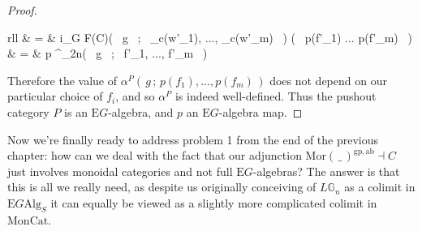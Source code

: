 \begin{proof}
\begin{eq*}
\begin{array}{rll}
			& = &  i_{G \times F(C)}( \, g \, ; \, _{c(w'_1)}, ..., _{c(w'_m)} \, ) \circ \big( \, p(f'_1) \otimes ... \otimes p(f'_m) \, \big) \\
			& = & p \alpha^{_{2n}}( \, g \, ; \, f'_1, ..., f'_m \, )		
		\end{array} 
\end{eq*}
Therefore the value of $\alpha^P( \, g \, ; \, p(f_1), ..., p(f_m) \, )$ does not depend on our particular choice of $f_i$, and so $\alpha^P$ is indeed well-defined. Thus the pushout category $P$ is an $\mathrm{E}G$-algebra, and $p$ an $\mathrm{E}G$-algebra map. 
\end{proof}

Now we're finally ready to address problem 1 from the end of the previous chapter: how can we deal with the fact that our adjunction $\mathrm{Mor}( \, \_ \, )^{\mathrm{gp}, \mathrm{ab}} \dashv C$ just involves monoidal categories and not full $\mathrm{E}G$-algebras? The answer is that this is all we really need, as despite us originally conceiving of $L\mathbb{G}_n$ as a colimit in $\mathrm{E}G\mathrm{Alg}_S$ it can equally be viewed as a slightly more complicated colimit in $\mathrm{MonCat}$.

